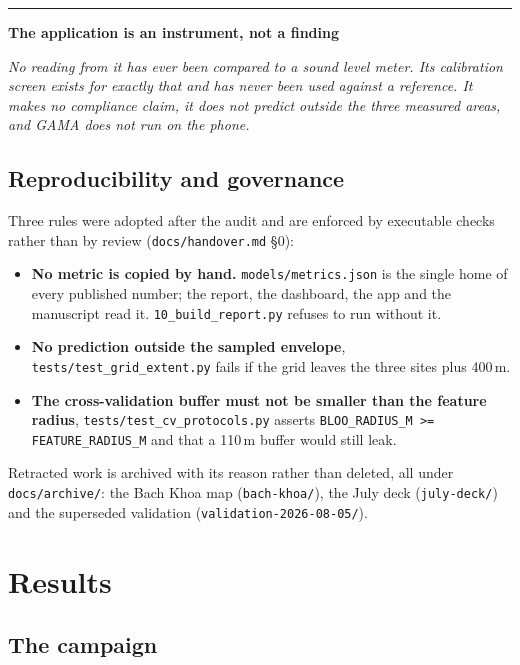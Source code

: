 \documentclass[11pt,a4paper]{article}
\newcommand{\pth}[1]{\texttt{\small #1}}
\newenvironment{caveat}[1]
 {\par\medskip\noindent\begin{minipage}{\linewidth}%
 \color{warnc}\rule{2pt}{\baselineskip}\hspace{.6em}\textbf{#1}\par\vspace{.2em}
 \hspace*{1.4em}\begin{minipage}{\dimexpr\linewidth-1.4em\relax}\small\itshape}
 {\end{minipage}\end{minipage}\par\medskip}
\begin{document}
\begin{caveat}{The application is an instrument, not a finding}
No reading from it has ever been compared to a sound level meter. Its
calibration screen exists for exactly that and has never been used against a
reference. It makes no compliance claim, it does not predict outside the three
measured areas, and GAMA does not run on the phone.
\end{caveat}

\subsection{Reproducibility and governance}

Three rules were adopted after the audit and are enforced by executable checks
rather than by review (\pth{docs/handover.md} §0):

\begin{itemize}
 \item \textbf{No metric is copied by hand.} \pth{models/metrics.json} is the
 single home of every published number; the report, the dashboard, the
 app and the manuscript read it. \pth{10\_build\_report.py} refuses to run
 without it.
 \item \textbf{No prediction outside the sampled envelope}, \pth{tests/test\_grid\_extent.py} fails if the grid leaves the three
 sites plus 400\,m.
 \item \textbf{The cross-validation buffer must not be smaller than the feature
 radius}, \pth{tests/test\_cv\_protocols.py} asserts
 \pth{BLOO\_RADIUS\_M >= FEATURE\_RADIUS\_M} and that a 110\,m buffer
 would still leak.
\end{itemize}

Retracted work is archived with its reason rather than deleted, all
under \pth{docs/archive/}: the Bach Khoa map (\pth{bach-khoa/}), the July deck
(\pth{july-deck/}) and the superseded validation
(\pth{validation-2026-08-05/}).

\section{Results}

\subsection{The campaign}
\end{document}
